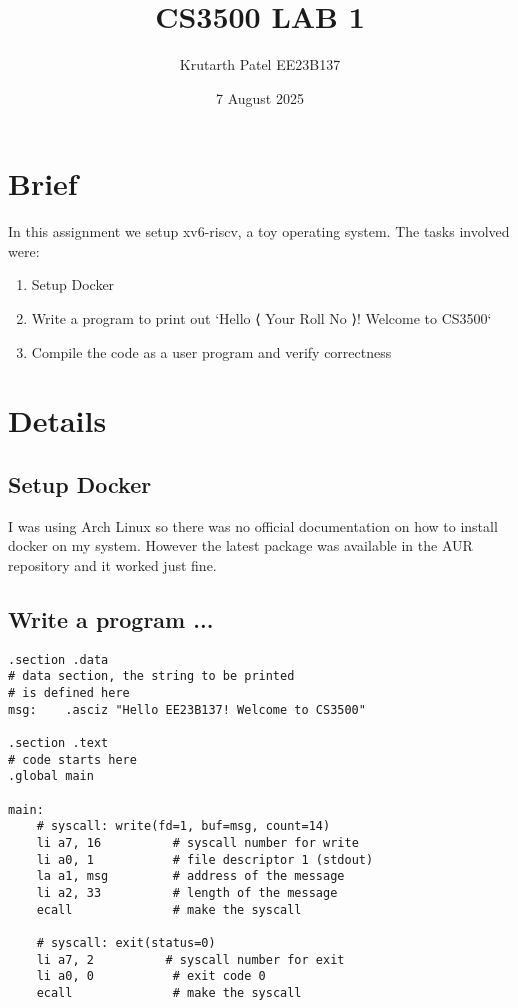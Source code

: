 \documentclass{article}
\title{CS3500 LAB 1}
\author{Krutarth Patel EE23B137}
\date{7 August 2025}
\begin{document}
\maketitle
\section*{Brief}
In this assignment we setup xv6-riscv, a toy operating system. The tasks involved were:
\begin{enumerate}
	\item Setup Docker
	\item Write a program to print out `Hello ⟨ Your Roll No ⟩! Welcome to CS3500`
	\item Compile the code as a user program and verify correctness
\end{enumerate}

\section*{Details}

\subsection{Setup Docker}
I was using Arch Linux so there was no official documentation on how to install docker on my system. However the latest package was available in the AUR repository and it worked just fine.

\subsection{Write a program ...}
\begin{verbatim}
.section .data
# data section, the string to be printed
# is defined here
msg:    .asciz "Hello EE23B137! Welcome to CS3500"

.section .text
# code starts here
.global main

main:
    # syscall: write(fd=1, buf=msg, count=14)
    li a7, 16          # syscall number for write
    li a0, 1           # file descriptor 1 (stdout)
    la a1, msg         # address of the message
    li a2, 33          # length of the message
    ecall              # make the syscall

    # syscall: exit(status=0)
    li a7, 2          # syscall number for exit
    li a0, 0           # exit code 0
    ecall              # make the syscall
\end{verbatim}
\end{document}
